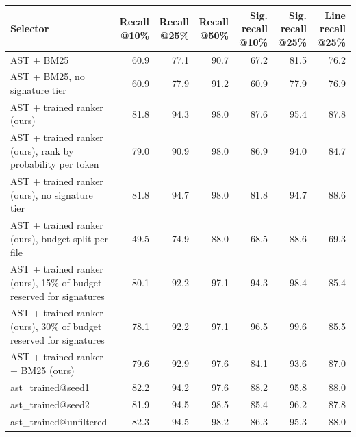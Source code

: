 \begin{tabular}{lrrrrrr}
\toprule
Selector & Recall @10\% & Recall @25\% & Recall @50\% & Sig. recall @10\% & Sig. recall @25\% & Line recall @25\% \\
\midrule
AST + BM25 & 60.9 & 77.1 & 90.7 & 67.2 & 81.5 & 76.2 \\
AST + BM25, no signature tier & 60.9 & 77.9 & 91.2 & 60.9 & 77.9 & 76.9 \\
AST + trained ranker (ours) & 81.8 & 94.3 & 98.0 & 87.6 & 95.4 & 87.8 \\
AST + trained ranker (ours), rank by probability per token & 79.0 & 90.9 & 98.0 & 86.9 & 94.0 & 84.7 \\
AST + trained ranker (ours), no signature tier & 81.8 & 94.7 & 98.0 & 81.8 & 94.7 & 88.6 \\
AST + trained ranker (ours), budget split per file & 49.5 & 74.9 & 88.0 & 68.5 & 88.6 & 69.3 \\
AST + trained ranker (ours), 15\% of budget reserved for signatures & 80.1 & 92.2 & 97.1 & 94.3 & 98.4 & 85.4 \\
AST + trained ranker (ours), 30\% of budget reserved for signatures & 78.1 & 92.2 & 97.1 & 96.5 & 99.6 & 85.5 \\
AST + trained ranker + BM25 (ours) & 79.6 & 92.9 & 97.6 & 84.1 & 93.6 & 87.0 \\
ast\_trained@seed1 & 82.2 & 94.2 & 97.6 & 88.2 & 95.8 & 88.0 \\
ast\_trained@seed2 & 81.9 & 94.5 & 98.5 & 85.4 & 96.2 & 87.8 \\
ast\_trained@unfiltered & 82.3 & 94.5 & 98.2 & 86.3 & 95.3 & 88.0 \\
\bottomrule
\end{tabular}
